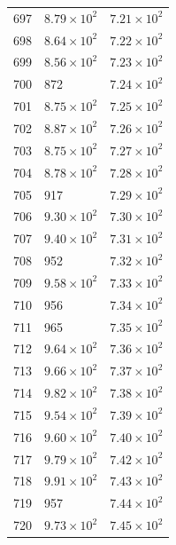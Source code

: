\begin{table}[H]
\begin{tabular}{lll}
697 & $\displaystyle 8.79 \times 10^{2}$ & $\displaystyle 7.21 \times 10^{2}$ \\
698 & $\displaystyle 8.64 \times 10^{2}$ & $\displaystyle 7.22 \times 10^{2}$ \\
699 & $\displaystyle 8.56 \times 10^{2}$ & $\displaystyle 7.23 \times 10^{2}$ \\
700 & 872 & $\displaystyle 7.24 \times 10^{2}$ \\
701 & $\displaystyle 8.75 \times 10^{2}$ & $\displaystyle 7.25 \times 10^{2}$ \\
702 & $\displaystyle 8.87 \times 10^{2}$ & $\displaystyle 7.26 \times 10^{2}$ \\
703 & $\displaystyle 8.75 \times 10^{2}$ & $\displaystyle 7.27 \times 10^{2}$ \\
704 & $\displaystyle 8.78 \times 10^{2}$ & $\displaystyle 7.28 \times 10^{2}$ \\
705 & 917 & $\displaystyle 7.29 \times 10^{2}$ \\
706 & $\displaystyle 9.30 \times 10^{2}$ & $\displaystyle 7.30 \times 10^{2}$ \\
707 & $\displaystyle 9.40 \times 10^{2}$ & $\displaystyle 7.31 \times 10^{2}$ \\
708 & 952 & $\displaystyle 7.32 \times 10^{2}$ \\
709 & $\displaystyle 9.58 \times 10^{2}$ & $\displaystyle 7.33 \times 10^{2}$ \\
710 & 956 & $\displaystyle 7.34 \times 10^{2}$ \\
711 & 965 & $\displaystyle 7.35 \times 10^{2}$ \\
712 & $\displaystyle 9.64 \times 10^{2}$ & $\displaystyle 7.36 \times 10^{2}$ \\
713 & $\displaystyle 9.66 \times 10^{2}$ & $\displaystyle 7.37 \times 10^{2}$ \\
714 & $\displaystyle 9.82 \times 10^{2}$ & $\displaystyle 7.38 \times 10^{2}$ \\
715 & $\displaystyle 9.54 \times 10^{2}$ & $\displaystyle 7.39 \times 10^{2}$ \\
716 & $\displaystyle 9.60 \times 10^{2}$ & $\displaystyle 7.40 \times 10^{2}$ \\
717 & $\displaystyle 9.79 \times 10^{2}$ & $\displaystyle 7.42 \times 10^{2}$ \\
718 & $\displaystyle 9.91 \times 10^{2}$ & $\displaystyle 7.43 \times 10^{2}$ \\
719 & 957 & $\displaystyle 7.44 \times 10^{2}$ \\
720 & $\displaystyle 9.73 \times 10^{2}$ & $\displaystyle 7.45 \times 10^{2}$ \\

\end{tabular}
\end{table}
